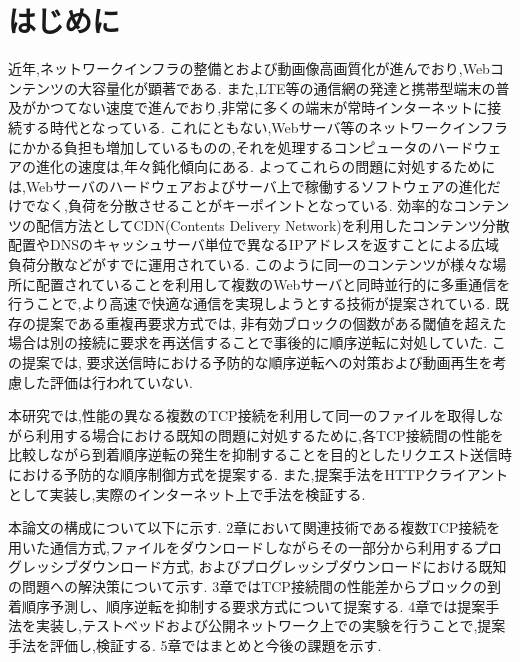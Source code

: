\documentclass[a4j,12pt]{gradthesis_utf8}
\begin{document}
 
\maketitle %

\chapter{はじめに}\label{sec:sec1}
近年,ネットワークインフラの整備とおよび動画像高画質化が進んでおり,Webコンテンツの大容量化が顕著である.
また,LTE等の通信網の発達と携帯型端末の普及がかつてない速度で進んでおり,非常に多くの端末が常時インターネットに接続する時代となっている.
これにともない,Webサーバ等のネットワークインフラにかかる負担も増加しているものの,それを処理するコンピュータのハードウェアの進化の速度は,年々鈍化傾向にある.
よってこれらの問題に対処するためには,Webサーバのハードウェアおよびサーバ上で稼働するソフトウェアの進化だけでなく,負荷を分散させることがキーポイントとなっている.
効率的なコンテンツの配信方法としてCDN(Contents Delivery Network)を利用したコンテンツ分散配置やDNSのキャッシュサーバ単位で異なるIPアドレスを返すことによる広域負荷分散などがすでに運用されている.
このように同一のコンテンツが様々な場所に配置されていることを利用して複数のWebサーバと同時並行的に多重通信を行うことで,より高速で快適な通信を実現しようとする技術が提案されている.
既存の提案である重複再要求方式では, 
非有効ブロックの個数がある閾値を超えた場合は別の接続に要求を再送信することで事後的に順序逆転に対処していた.
この提案では, 要求送信時における予防的な順序逆転への対策および動画再生を考慮した評価は行われていない.

本研究では,性能の異なる複数のTCP接続を利用して同一のファイルを取得しながら利用する場合における既知の問題に対処するために,各TCP接続間の性能を比較しながら到着順序逆転の発生を抑制することを目的としたリクエスト送信時における予防的な順序制御方式を提案する.
また,提案手法をHTTPクライアントとして実装し,実際のインターネット上で手法を検証する.

本論文の構成について以下に示す.
2章において関連技術である複数TCP接続を用いた通信方式,ファイルをダウンロードしながらその一部分から利用するプログレッシブダウンロード方式, およびプログレッシブダウンロードにおける既知の問題への解決策について示す.
3章ではTCP接続間の性能差からブロックの到着順序予測し、順序逆転を抑制する要求方式について提案する.
4章では提案手法を実装し,テストベッドおよび公開ネットワーク上での実験を行うことで,提案手法を評価し,検証する.
5章ではまとめと今後の課題を示す.
\end{document}
